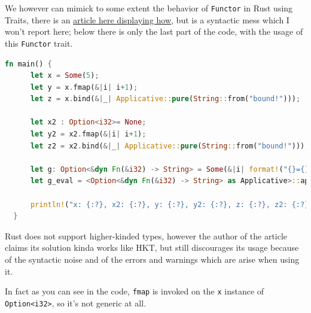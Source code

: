 We however can mimick to some extent the behavior of \lstinline|Functor| in Rust using Traits, there is an \href{https://hugopeters.me/posts/14/}{article here displaying how}, but is a syntactic mess which I won't report here; below there is only the last part of the code, with the usage of this \lstinline|Functor| trait.
\begin{lstlisting}[language=Rust]
   fn main() {
      let x = Some(5);
      let y = x.fmap(&|i| i+1);
      let z = x.bind(&|_| Applicative::pure(String::from("bound!")));
  
      let x2 : Option<i32>= None;
      let y2 = x2.fmap(&|i| i+1);
      let z2 = x2.bind(&|_| Applicative::pure(String::from("bound!")));
  
      let g: Option<&dyn Fn(&i32) -> String> = Some(&|i| format!("{}={}", i, i));
      let g_eval = <Option<&dyn Fn(&i32) -> String> as Applicative>::ap(&g, &Some(69));
  
      println!("x: {:?}, x2: {:?}, y: {:?}, y2: {:?}, z: {:?}, z2: {:?}, geval: {:?}", x, x2, y, y2, z, z2, g_eval);
  }
\end{lstlisting}


Rust does not support higher-kinded types, however the author of the article claims its solution kinda works like HKT, but still discourages its usage because of the syntactic noise and of the errors and warnings which are arise when using it.

In fact as you can see in the code, \lstinline|fmap| is invoked on the \lstinline|x| instance of \lstinline|Option<i32>|, so it's not generic at all.

